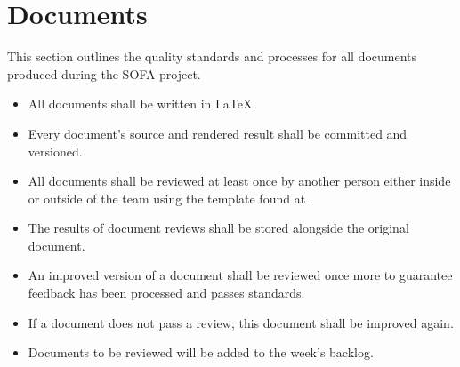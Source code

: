 \section{Documents}
This section outlines the quality standards and processes for all documents produced during the SOFA project.

\begin{itemize}
	\item All documents shall be written in LaTeX.
	\item Every document's source and rendered result shall be committed and versioned.
	\item All documents shall be reviewed at least once by another person either inside or outside of the team using the template found at .
	\item The results of document reviews shall be stored alongside the original document.
	\item An improved version of a document shall be reviewed once more to guarantee feedback has been processed and passes standards.
	\item If a document does not pass a review, this document shall be improved again.
	\item Documents to be reviewed will be added to the week's backlog.
	
\end{itemize}
